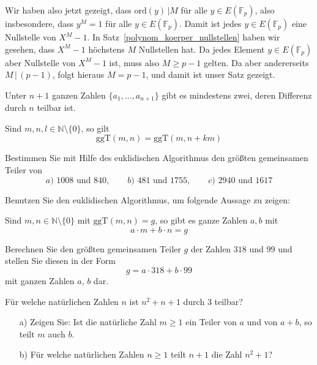 {Wir haben also jetzt gezeigt, dass $\textrm{ord}(y) \, \vert M$ für alle $y \in  E(\mathbb F_p)$, also insbesondere, 
dass $y^M = 1$ für alle $y \in  E(\mathbb F_p)$. Damit ist jedes $y \in E(\mathbb F_p)$ eine Nullstelle von 
$X^M-1$. In Satz~\ref{polynom_koerper_nullstellen} haben wir gesehen, dass $X^M-1$ höchstens $M$ Nullstellen 
hat. Da jedes Element $y \in  E(\mathbb F_p)$ aber Nullstelle von $X^M-1$ ist, muss also $M \geq p-1$ gelten. 
Da aber andererseits $M \, \vert \, (p-1)$, folgt hieraus $M = p-1$, und damit ist unser Satz gezeigt.
}
\bigbreak

\begin{aufgabe} Unter $n+1$ ganzen Zahlen $\{ a_1, \ldots, a_{n+1}\}$ gibt es mindestens zwei, deren 
Differenz durch $n$ teilbar ist.
\end{aufgabe}

\begin{aufgabe}\label{gruppe_aufg_euklid} Sind $m,n,l \in  \mathbb N \setminus \{0 \}$, so gilt
  	$$ \textrm{ggT}(m,n) = \textrm{ggT}(m,n+km) $$    
\end{aufgabe}

\begin{aufgabe} Bestimmen Sie mit Hilfe des euklidischen Algorithmus den größten gemeinsamen Teiler von 
  	$$  a) \,\, 1008 \textrm{ und } 840, \qquad b) \,\, 481 \textrm{ und } 1755, \qquad c) \,\, 
     	2940 \textrm{ und } 1617   $$
\end{aufgabe}

\begin{aufgabe}\label{gruppe_aufg_erw_euklid} 
Benutzen Sie den euklidischen Algorithmus, um folgende Aussage zu zeigen: 

Sind $m,n\in \mathbb N \setminus \{0 \}$ mit $\textrm{ggT}(m,n) = g$, so gibt es ganze Zahlen $a,b$ mit 
  	$$ a \cdot m + b \cdot n = g $$
\end{aufgabe}

\begin{aufgabe} Berechnen Sie den größten gemeinsamen Teiler $g$ der Zahlen $318$ und $99$ 
und stellen Sie diesen in der Form
  	$$ g = a \cdot 318 + b \cdot  99 $$
mit ganzen Zahlen $a$, $b$ dar. 
\end{aufgabe}


\begin{aufgabe} Für welche natürlichen Zahlen $n$ ist $n^2 + n + 1$ durch 3 teilbar?
\end{aufgabe}

\begin{aufgabe} 
\begin{itemize}
\item[a)] Zeigen Sie: Ist die natürliche Zahl $m \geq 1$ ein Teiler von $a$ und von $a+b$, so teilt $m$ auch $b$.
\item[b)]Für welche natürlichen Zahlen $ n \geq 1$ teilt $n+1$ die Zahl $n^2 +1$?
\end{itemize}
\end{aufgabe}

